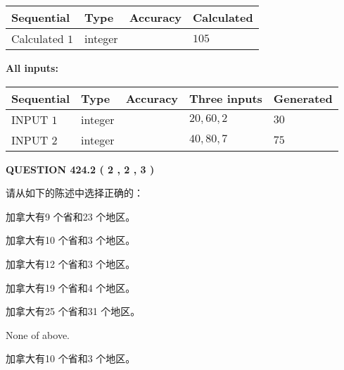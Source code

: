 \documentclass{ctexart}
\begin{document}
  
\noindent\begin{tabular}{|l|l|l|l|}
\hline
 Sequential & Type & Accuracy & Calculated \\ 
\hline
 
 
  Calculated $  1 $ & integer &  & 
  $ 105 $ 
 \\  \hline  
 \end{tabular}
   
   
   
   
\noindent\vspace{0.1in}\hspace{-0.08in} {\textbf{\Large{All inputs: }}}
   
   
  
  
\noindent\begin{tabular}{|l|l|l|l|l|}
\hline
 Sequential & Type & Accuracy & Three inputs & Generated \\ 
\hline
 
 
  INPUT $  1 $ & integer &  & $
 20
 , 
 60
 , 
 2
 $ & $ 30 $ 
 \\  \hline  
 
 
  INPUT $  2 $ & integer &  & $
 40
 , 
 80
 , 
 7
 $ & $ 75 $ 
 \\  \hline  
 \end{tabular}
   
   
  
\vspace{0.2in}
  
{\textbf{\Large{QUESTION
424.2 
 ( 2 , 2 , 3 )
}}}
  
  
请从如下的陈述中选择正确的：
 
 
加拿大有9 个省和23 个地区。
 
 
加拿大有10 个省和3 个地区。
 
 
加拿大有12 个省和3 个地区。
 
 
加拿大有19 个省和4 个地区。
 
 
加拿大有25 个省和31 个地区。
 
 
 None of above.
 
 
\noindent{}
 
 
加拿大有10 个省和3 个地区。
 
 
\noindent{}
 
\end{document}
